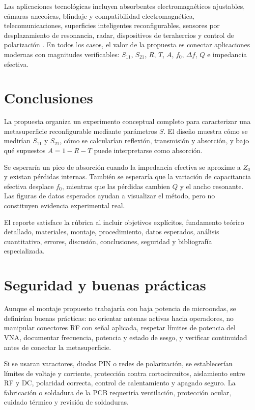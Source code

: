 \documentclass[12pt,a4paper]{article}
\begin{document}
Las aplicaciones tecnológicas incluyen absorbentes electromagnéticos ajustables, cámaras anecoicas, blindaje y compatibilidad electromagnética, telecomunicaciones, superficies inteligentes reconfigurables, sensores por desplazamiento de resonancia, radar, dispositivos de terahercios y control de polarización \citep{yu2014flat,watts2012metamaterial,cui2014coding}. En todos los casos, el valor de la propuesta es conectar aplicaciones modernas con magnitudes verificables: \(S_{11}\), \(S_{21}\), \(R\), \(T\), \(A\), \(f_0\), \(\Delta f\), \(Q\) e impedancia efectiva.

\section{Conclusiones}

La propuesta organiza un experimento conceptual completo para caracterizar una metasuperficie reconfigurable mediante parámetros \(S\). El diseño muestra cómo se medirían \(S_{11}\) y \(S_{21}\), cómo se calcularían reflexión, transmisión y absorción, y bajo qué supuestos \(A=1-R-T\) puede interpretarse como absorción.

Se esperaría un pico de absorción cuando la impedancia efectiva se aproxime a \(Z_0\) y existan pérdidas internas. También se esperaría que la variación de capacitancia efectiva desplace \(f_0\), mientras que las pérdidas cambien \(Q\) y el ancho resonante. Las figuras de datos esperados ayudan a visualizar el método, pero no constituyen evidencia experimental real.

El reporte satisface la rúbrica al incluir objetivos explícitos, fundamento teórico detallado, materiales, montaje, procedimiento, datos esperados, análisis cuantitativo, errores, discusión, conclusiones, seguridad y bibliografía especializada.

\section{Seguridad y buenas prácticas}

Aunque el montaje propuesto trabajaría con baja potencia de microondas, se definirían buenas prácticas: no orientar antenas activas hacia operadores, no manipular conectores RF con señal aplicada, respetar límites de potencia del VNA, documentar frecuencia, potencia y estado de sesgo, y verificar continuidad antes de conectar la metasuperficie.

Si se usaran varactores, diodos PIN o redes de polarización, se establecerían límites de voltaje y corriente, protección contra cortocircuitos, aislamiento entre RF y DC, polaridad correcta, control de calentamiento y apagado seguro. La fabricación o soldadura de la PCB requeriría ventilación, protección ocular, cuidado térmico y revisión de soldaduras.
\end{document}
